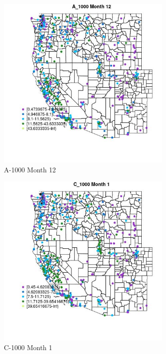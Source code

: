 \begin{figure} 
\centering  
\includegraphics[width=0.77\textwidth]{Code_Outputs/ML_input_report_ML_input_PM25_Step5_part_d_de_duplicated_aves_ML_input_MapObsMo12A_1000.jpg} 
\caption{\label{fig:ML_input_report_ML_input_PM25_Step5_part_d_de_duplicated_aves_ML_inputMapObsMo12A_1000}A-1000 Month 12} 
\end{figure} 
 

\begin{figure} 
\centering  
\includegraphics[width=0.77\textwidth]{Code_Outputs/ML_input_report_ML_input_PM25_Step5_part_d_de_duplicated_aves_ML_input_MapObsMo1C_1000.jpg} 
\caption{\label{fig:ML_input_report_ML_input_PM25_Step5_part_d_de_duplicated_aves_ML_inputMapObsMo1C_1000}C-1000 Month 1} 
\end{figure} 
 

